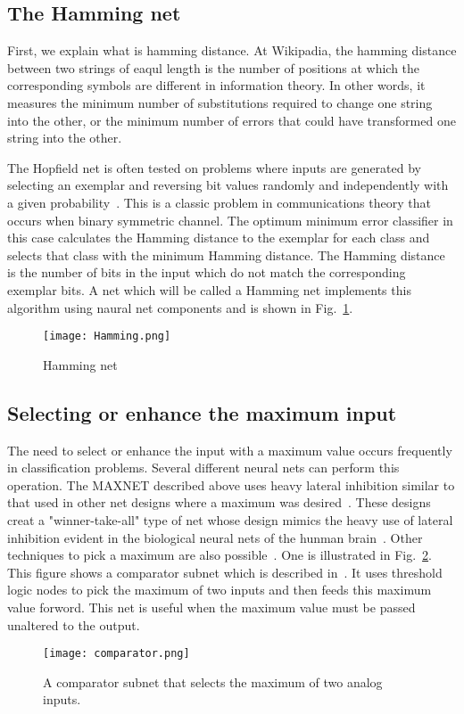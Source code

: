 \documentclass[10pt,twocolumn,letterpaper]{article}
\begin{document}
\subsection{The Hamming net}
\par First, we explain what is hamming distance. At Wikipadia, the hamming distance between two strings of eaqul length is the number of positions at which the corresponding symbols are different in information theory. In other words, it measures the minimum number of substitutions required to change one string into the other, or the minimum number of errors that could have transformed one string into the other.
\par The Hopfield net is often tested on problems where inputs are generated by selecting an exemplar and reversing bit values randomly and independently with a given probability~\cite{hopfield1982neural}. This is a classic problem in communications theory that occurs when binary symmetric channel. The optimum minimum error classifier in this case calculates the Hamming distance to the exemplar for each class and selects that class with the minimum Hamming distance. The Hamming distance is the number of bits in the input which do not match the corresponding exemplar bits. A net which will be called a Hamming net implements this algorithm using naural net components and is shown in Fig.~\ref{Hamming}.
 \begin{figure}[htbp]
 \centering{}
\texttt{[image: Hamming.png]}\\
 \caption{Hamming net}
\label{Hamming}
\end{figure}
\subsection{Selecting or enhance the maximum input}
\par The need to select or enhance the input with a maximum value occurs frequently in classification problems. Several different neural nets can perform this operation. The MAXNET described above uses heavy lateral inhibition similar to that used in other net designs where a maximum was desired~\cite{hopfield1986computing}. These designs creat a "winner-take-all" type of net whose design mimics the heavy use of lateral inhibition evident in the biological neural nets of the hunman brain~\cite{kandel2000principles}. Other techniques to pick a maximum are also possible~\cite{lippmann1987comparison}. One is illustrated in Fig.~\ref{comparator}. This figure shows a comparator subnet which is described in~\cite{martin1970acoustic}. It uses threshold logic nodes to pick the maximum of two inputs and then feeds this maximum value forword. This net is useful when the maximum value must be passed unaltered to the output. 
\begin{figure}[htbp]
 \centering{}
\texttt{[image: comparator.png]}\\
 \caption{A comparator subnet that selects the maximum of two analog inputs.}
\label{comparator}
\end{figure}
\end{document}
